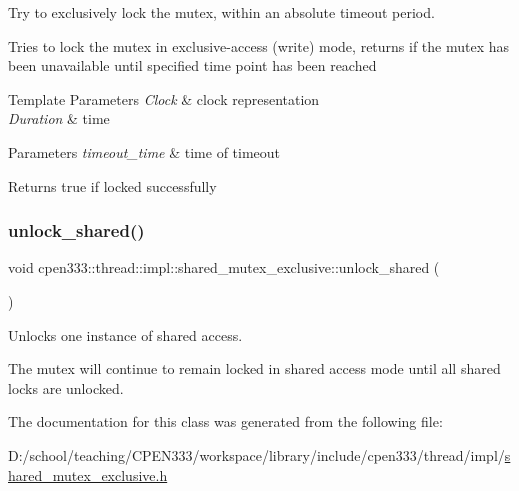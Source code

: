 Try to exclusively lock the mutex, within an absolute timeout period. 

Tries to lock the mutex in exclusive-\/access (write) mode, returns if the mutex has been unavailable until specified time point has been reached


\begin{DoxyTemplParams}{Template Parameters}
{\em Clock} & clock representation \\
\hline
{\em Duration} & time \\
\hline
\end{DoxyTemplParams}

\begin{DoxyParams}{Parameters}
{\em timeout\+\_\+time} & time of timeout \\
\hline
\end{DoxyParams}
\begin{DoxyReturn}{Returns}
true if locked successfully 
\end{DoxyReturn}
\mbox{\label{classcpen333_1_1thread_1_1impl_1_1shared__mutex__exclusive_ab80e738628379fd1884aed75cf2b9081}} 
\subsubsection{\texorpdfstring{unlock\+\_\+shared()}{unlock\_shared()}}
{\footnotesize\ttfamily void cpen333\+::thread\+::impl\+::shared\+\_\+mutex\+\_\+exclusive\+::unlock\+\_\+shared (\begin{DoxyParamCaption}{ }\end{DoxyParamCaption})\hspace{0.3cm}{\ttfamily [inline]}}



Unlocks one instance of shared access. 

The mutex will continue to remain locked in shared access mode until all shared locks are unlocked. 

The documentation for this class was generated from the following file\+:\begin{DoxyCompactItemize}
\item 
D\+:/school/teaching/\+C\+P\+E\+N333/workspace/library/include/cpen333/thread/impl/\hyperlink{thread_2impl_2shared__mutex__exclusive_8h}{shared\+\_\+mutex\+\_\+exclusive.\+h}\end{DoxyCompactItemize}
